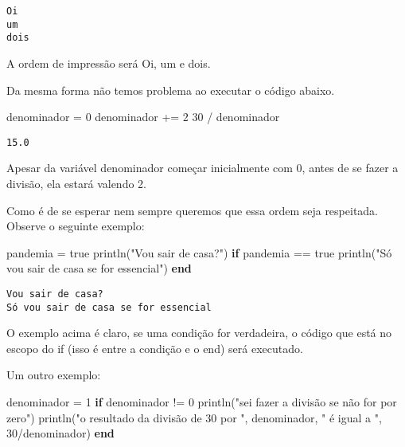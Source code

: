 \documentclass[
  letterpaper,
  DIV=11,
  numbers=noendperiod]{scrreprt}
\newenvironment{Shaded}{\begin{snugshade}}{\end{snugshade}}
\newcommand{\ConstantTok}[1]{\textcolor[rgb]{0.56,0.35,0.01}{#1}}
\newcommand{\ControlFlowTok}[1]{\textcolor[rgb]{0.00,0.23,0.31}{\textbf{#1}}}
\newcommand{\FloatTok}[1]{\textcolor[rgb]{0.68,0.00,0.00}{#1}}
\newcommand{\FunctionTok}[1]{\textcolor[rgb]{0.28,0.35,0.67}{#1}}
\newcommand{\NormalTok}[1]{\textcolor[rgb]{0.00,0.23,0.31}{#1}}
\newcommand{\OperatorTok}[1]{\textcolor[rgb]{0.37,0.37,0.37}{#1}}
\newcommand{\StringTok}[1]{\textcolor[rgb]{0.13,0.47,0.30}{#1}}
\begin{document}
\begin{verbatim}
Oi
um
dois
\end{verbatim}

A ordem de impressão será Oi, um e dois.

Da mesma forma não temos problema ao executar o código abaixo.

\begin{Shaded}
\begin{Highlighting}[]
\NormalTok{denominador }\OperatorTok{=} \FloatTok{0}
\NormalTok{denominador }\OperatorTok{+=} \FloatTok{2}
\FloatTok{30} \OperatorTok{/}\NormalTok{ denominador}
\end{Highlighting}
\end{Shaded}

\begin{verbatim}
15.0
\end{verbatim}

Apesar da variável denominador começar inicialmente com 0, antes de se
fazer a divisão, ela estará valendo 2.

Como é de se esperar nem sempre queremos que essa ordem seja respeitada.
Observe o seguinte exemplo:

\begin{Shaded}
\begin{Highlighting}[]
\NormalTok{pandemia }\OperatorTok{=} \ConstantTok{true}
\FunctionTok{println}\NormalTok{(}\StringTok{"Vou sair de casa?"}\NormalTok{)}
\ControlFlowTok{if}\NormalTok{ pandemia }\OperatorTok{==} \ConstantTok{true}
   \FunctionTok{println}\NormalTok{(}\StringTok{"Só vou sair de casa se for essencial"}\NormalTok{)}
\ControlFlowTok{end}
\end{Highlighting}
\end{Shaded}

\begin{verbatim}
Vou sair de casa?
Só vou sair de casa se for essencial
\end{verbatim}

O exemplo acima é claro, se uma condição for verdadeira, o código que
está no escopo do if (isso é entre a condição e o end) será executado.

Um outro exemplo:

\begin{Shaded}
\begin{Highlighting}[]
\NormalTok{denominador }\OperatorTok{=} \FloatTok{1}
\ControlFlowTok{if}\NormalTok{ denominador }\OperatorTok{!=} \FloatTok{0}
   \FunctionTok{println}\NormalTok{(}\StringTok{"sei fazer a divisão se não for por zero"}\NormalTok{)}
   \FunctionTok{println}\NormalTok{(}\StringTok{"o resultado da divisão de 30 por "}\NormalTok{, denominador, }\StringTok{" é igual a "}\NormalTok{, }\FloatTok{30}\OperatorTok{/}\NormalTok{denominador)}
\ControlFlowTok{end}
\end{Highlighting}
\end{Shaded}
\end{document}
